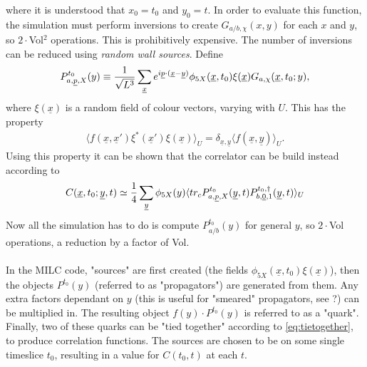 where it is understood that $x_0=t_0$ and $y_0=t$. In order to evaluate this function, the simulation must perform inversions to create $G_{a/b,\chi}(x,y)$ for each $x$ and $y$, so $2\cdot$Vol$^2$ operations. This is prohibitively expensive. The number of inversions can be reduced using {\it{random wall sources}}. Define
\begin{align}
	P^{t_0}_{a,\underline{p},X}(y) \equiv {1\over \sqrt{L^3}} \sum_{\underline{x}} e^{i\underline{p}\cdot (\underline{x}-\underline{y})} \phi_{5X}(\underline{x},t_0) \xi(\underline{x}) G_{a,\chi}(\underline{x},t_0;y),
\end{align} 
where $\xi(\underline{x})$ is a random field of colour vectors, varying with $U$. This has the property
\begin{align}
	\langle f(\underline{x},\underline{x}') \xi^*(\underline{x}')\xi(\underline{x})\rangle_U = \delta_{\underline{x},\underline{y}} \langle f(\underline{x},\underline{y}) \rangle_U.
\end{align}
Using this property it can be shown that the correlator can be build instead according to
\begin{align}
	C(\underline{x},t_0;\underline{y},t) \simeq {1\over 4} \sum_{\underline{y}} \phi_{5X}(y) \langle tr_c P^{t_0}_{a,\underline{p},X}(\underline{y},t)P^{t_0,\dagger}_{b,\underline{0},1}(\underline{y},t)\rangle_U
	\label{eq:tietogether}
\end{align}
Now all the simulation has to do is compute $P^{t_0}_{a/b}(y)$ for general $y$, so $2\cdot$Vol operations, a reduction by a factor of Vol. 
\\ \\
In the MILC code, "sources" are first created (the fields $\phi_{5X}(\underline{x},t_0) \xi(\underline{x})$), then the objects $P^{t_0}(y)$ (referred to as "propagators") are generated from them. Any extra factors dependant on $y$ (this is useful for "smeared" propagators, see {\color{red}?}) can be multiplied in. The resulting object $f(y)\cdot P^{t_0}(y)$ is referred to as a "quark". Finally, two of these quarks can be "tied together" according to \eqref{eq:tietogether}, to produce correlation functions. The sources are chosen to be on some single timeslice $t_0$, resulting in a value for $C(t_0,t)$ at each $t$. 


